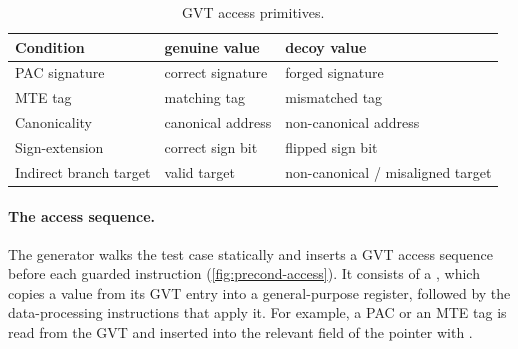 \begin{table}[t]
\centering
\footnotesize
\setlength{\tabcolsep}{6pt}
\caption{GVT access primitives.}
\label{tab:precond-primitives}
\begin{tabular}{@{}l l l@{}}
\toprule
Condition & genuine value & decoy value \\
\midrule
PAC signature          & correct signature & forged signature \\
MTE tag                & matching tag      & mismatched tag \\
Canonicality           & canonical address & non-canonical address \\
Sign-extension         & correct sign bit  & flipped sign bit \\
Indirect branch target & valid target      & non-canonical / misaligned target \\
\bottomrule
\end{tabular}
\end{table}

\paragraph{The access sequence.}
The generator walks the test case
statically and inserts a GVT access sequence before each guarded instruction (\autoref{fig:precond-access}).
It consists of a , which copies a value from its GVT entry into a
general-purpose register, followed by the data-processing instructions that apply it. For example,
a PAC or an MTE tag is read from the GVT and inserted into the relevant field of the pointer with
.

